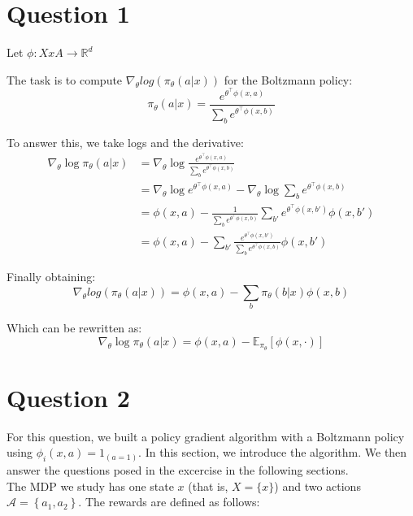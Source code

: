 \documentclass[a4paper, 11pt]{article} %
\begin{document}
\section*{Question 1}

Let $\phi : X x A \rightarrow \mathbb{R}^{d}$

The task is to compute $\nabla_{\theta}log(\pi_{\theta}(a|x))$ for the Boltzmann policy:
\begin{equation}
\pi_{\theta}(a | x)= \frac{e^{\theta^{\top} \phi(x, a)}}{\sum_{b} e^{\theta^{\top} \phi(x, b)}}
\end{equation}

To answer this, we take logs and the derivative:
\begin{align}
\nabla_{\theta} \log \pi_{\theta}(a | x) 
&=\nabla_{\theta} \log \frac{e^{\theta^{\top} \phi(x, a)}}{\sum_{b} e^{\theta^{\top} \phi(x, b)}}  \\
&=\nabla_{\theta} \log e^{\theta^{\top} \phi(x, a)}-\nabla_{\theta} \log \sum_{b} e^{\theta^{\top} \phi(x, b)} \\
&=\phi(x, a)-\frac{1}{\sum_{b} e^{\theta^{\top} \phi(x, b)}}\sum_{b'} e^{\theta^{\top} \phi(x, b')} \phi(x, b') \\
& =\phi(x, a)-\sum_{b'} \frac{e^{\theta^{\top} \phi(x, b')} }{\sum_{b} e^{\theta^{\top} \phi (x, b)} } \phi(x, b')
\end{align}

Finally obtaining:
\begin{equation}
\nabla_{\theta}log(\pi_{\theta}(a|x)) = \phi(x, a)-\sum_{b} \pi_{\theta}(b|x) \phi(x, b)
\end{equation}

Which can be rewritten as:
\begin{equation}
\nabla_{\theta} \log \pi_{\theta}(a| x)=\phi(x, a)-\mathbb{E}_{\pi_{\theta}}[\phi(x, \cdot)]
\end{equation}


\section*{Question 2}
For this question, we built a policy gradient algorithm with a Boltzmann policy using $\phi_i(x,a) = 1_{(a=1)}$. In this section, we introduce the algorithm. We then answer the questions posed in the excercise in the following sections. \\

The MDP we study has one state $x$ (that is, $X=\{x\}$) and two actions $\mathcal{A}=\left\{a_{1}, a_{2}\right\}$. The rewards are defined as follows: 
\end{document}
